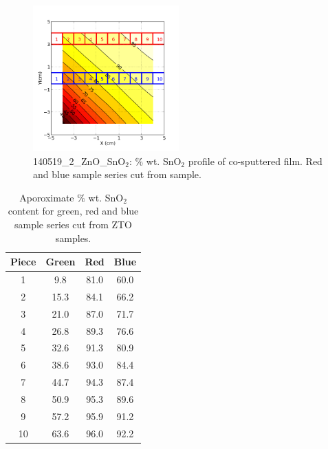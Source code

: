 \documentclass{article}
\begin{document}
\begin{figure}[ht]
\centering
\includegraphics[width=0.5\textwidth]{140519_2_ZnO_SnO2_pieces.png}
\caption{\label{fig:3} 140519\_2\_ZnO\_SnO$_2$: $\%$ wt. SnO$_2$ profile of co-sputtered film. Red and blue sample series cut from sample.}
\end{figure}



\begin{table}[p]
\caption{Aporoximate $\%$ wt. SnO$_2$ content for green, red and blue sample series cut from ZTO samples.}
\centering
\begin{tabular}{c c c c}
\hline\hline
Piece & Green & Red & Blue  \\ [0.5ex]
\hline
1 & 9.8 & 81.0 & 60.0  \\
2 & 15.3 & 84.1 & 66.2  \\
3 & 21.0 & 87.0 & 71.7  \\
4 & 26.8 & 89.3 & 76.6  \\
5 & 32.6 & 91.3 & 80.9 \\
6 & 38.6 & 93.0 & 84.4  \\
7 & 44.7 & 94.3 & 87.4  \\
8 & 50.9 & 95.3 & 89.6  \\
9 & 57.2 & 95.9 & 91.2 \\
10 & 63.6 & 96.0 & 92.2  \\
\hline
\end{tabular}
\label{table:nonlin}
\end{table}
\end{document}
